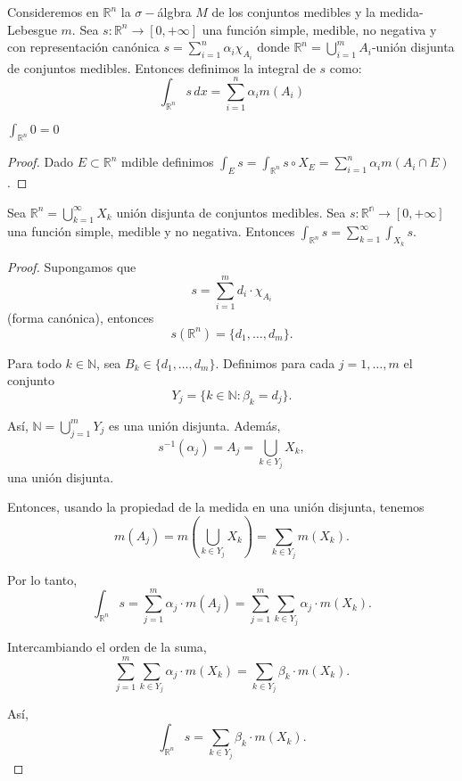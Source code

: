 \label{Integral de una Función Simple}
\begin{definición}
Consideremos en $\mathbb{R}^n$ la $\sigma-$álgbra $M$ de los conjuntos medibles y la medida-Lebesgue $m$. Sea $s: \mathbb{R}^n \to [0, +\infty]$ una función simple, medible, no negativa y con representación canónica $s = \sum_{i = 1}^{n}\alpha_i\chi_{A_i}$ donde $\mathbb{R}^n = \bigcup_{i = 1}^{m}A_i$-unión disjunta de conjuntos medibles. Entonces definimos la integral de $s$ como: \[\int_{\mathbb{R}^n}s \, dx = \sum_{i = 1}^{n}\alpha_im(A_i)\]
\end{definición}
\begin{observación}
$\int_{\mathbb{R}^n}0 = 0$
\end{observación}
\begin{proof}
    Dado $E \subset \mathbb{R}^n$ mdible definimos $\int_{E}s = \int_{\mathbb{R}^n}s\circ X_E = \sum_{i = 1}^{n}\alpha_im(A_i \cap E)$.
\end{proof}
\begin{lema}
    Sea $\mathbb{R}^n = \bigcup_{k = 1}^{\infty}X_k$ unión disjunta de conjuntos medibles. Sea $s: \mathbb{R^n} \to [0, +\infty]$ una función simple, medible y no negativa. Entonces $\int_{\mathbb{R}^n}s = \sum_{k = 1}^{\infty}\int_{X_k}s$.
\end{lema}
\begin{proof}
    Supongamos que
    $$ s = \sum_{i=1}^{m} d_i \cdot \chi_{A_i} $$
    (forma canónica), entonces
    $$ s(\mathbb{R}^n) = \{ d_1, \dots, d_m \}. $$

    Para todo $k \in \mathbb{N}$, sea $B_k \in \{ d_1, \dots, d_m \}$. Definimos
    para cada $j = 1, \dots, m$ el conjunto $$ Y_j = \{ k \in \mathbb{N} : \beta_k
        = d_j \}. $$

    Así, $\mathbb{N} = \bigcup_{j=1}^{m} Y_j$ es una unión disjunta. Además, $$
        s^{-1}(\alpha_j) = A_j = \bigcup_{k \in Y_j} X_k, $$ una unión disjunta.

    Entonces, usando la propiedad de la medida en una unión disjunta, tenemos $$
        m(A_j) = m \left( \bigcup_{k \in Y_j} X_k \right) = \sum_{k \in Y_j} m(X_k). $$

    Por lo tanto, $$ \int_{\mathbb{R}^n} s = \sum_{j=1}^{m} \alpha_j \cdot m(A_j) =
        \sum_{j=1}^{m} \sum_{k \in Y_j} \alpha_j \cdot m(X_k). $$

    Intercambiando el orden de la suma, $$ \sum_{j=1}^{m} \sum_{k \in Y_j} \alpha_j
        \cdot m(X_k) = \sum_{k \in Y_j} \beta_k \cdot m(X_k). $$

    Así, $$ \int_{\mathbb{R}^n} s = \sum_{k \in Y_j} \beta_k \cdot m(X_k). $$
\end{proof}
